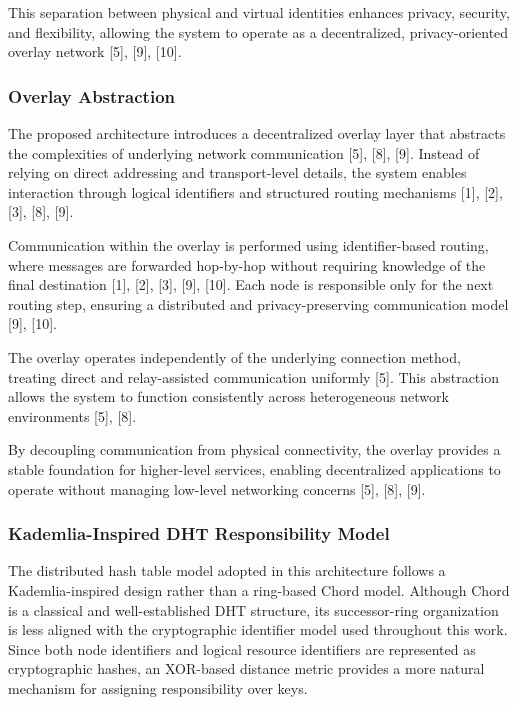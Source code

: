 \documentclass[12pt,a4paper]{article}
\begin{document}
This separation between physical and virtual identities enhances privacy, security, and flexibility, allowing the system to operate as a decentralized, privacy-oriented overlay network [5], [9], [10].

\subsubsection{Overlay Abstraction}

The proposed architecture introduces a decentralized overlay layer that abstracts the complexities of underlying network communication [5], [8], [9]. Instead of relying on direct addressing and transport-level details, the system enables interaction through logical identifiers and structured routing mechanisms [1], [2], [3], [8], [9].

Communication within the overlay is performed using identifier-based routing, where messages are forwarded hop-by-hop without requiring knowledge of the final destination [1], [2], [3], [9], [10]. Each node is responsible only for the next routing step, ensuring a distributed and privacy-preserving communication model [9], [10].

The overlay operates independently of the underlying connection method, treating direct and relay-assisted communication uniformly [5]. This abstraction allows the system to function consistently across heterogeneous network environments [5], [8].

By decoupling communication from physical connectivity, the overlay provides a stable foundation for higher-level services, enabling decentralized applications to operate without managing low-level networking concerns [5], [8], [9].


\subsubsection{Kademlia-Inspired DHT Responsibility Model}

The distributed hash table model adopted in this architecture follows a
Kademlia-inspired design rather than a ring-based Chord model. Although Chord is a
classical and well-established DHT structure, its successor-ring organization is less
aligned with the cryptographic identifier model used throughout this work. Since
both node identifiers and logical resource identifiers are represented as
cryptographic hashes, an XOR-based distance metric provides a more natural
mechanism for assigning responsibility over keys.
\end{document}
